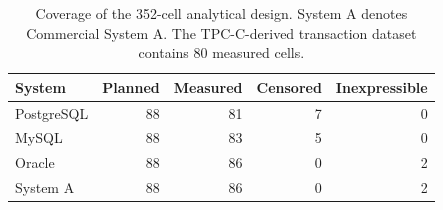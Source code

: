 \begin{table}[!t]
\caption{Coverage of the 352-cell analytical design. System A denotes Commercial System A. The TPC-C-derived transaction dataset contains 80 measured cells.}\label{tab:coverage}
\centering\small\renewcommand{\arraystretch}{1.15}
\begin{tabular}{lrrrr}\toprule
System & Planned & Measured & Censored & Inexpressible \\\midrule
PostgreSQL & 88 & 81 & 7 & 0 \\
MySQL & 88 & 83 & 5 & 0 \\
Oracle & 88 & 86 & 0 & 2 \\
System A & 88 & 86 & 0 & 2 \\
\bottomrule\end{tabular}\end{table}

